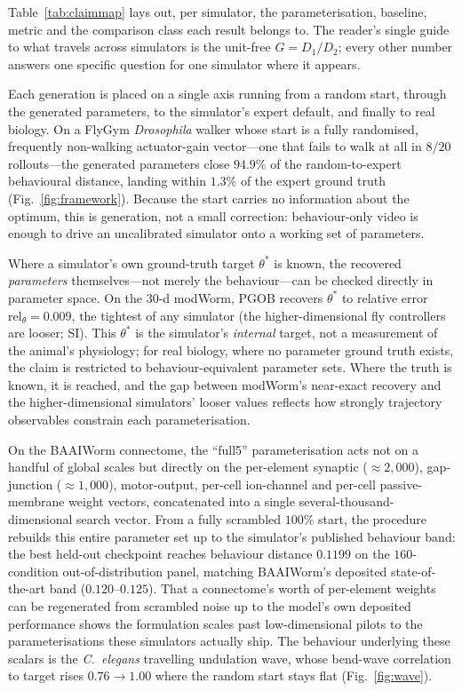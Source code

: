 \documentclass[11pt]{article}
\begin{document}
Table~\ref{tab:claimmap} lays out, per simulator, the parameterisation, baseline, metric and the comparison class each result belongs to. The reader's single guide to what travels across simulators is the unit-free $G{=}D_1/D_2$; every other number answers one specific question for one simulator where it appears.

Each generation is placed on a single axis running from a random start, through the generated parameters, to the simulator's expert default, and finally to real biology. On a FlyGym \emph{Drosophila} walker whose start is a fully randomised, frequently non-walking actuator-gain vector---one that fails to walk at all in $8/20$ rollouts---the generated parameters close $94.9\%$ of the random-to-expert behavioural distance, landing within $1.3\%$ of the expert ground truth (Fig.~\ref{fig:framework}). Because the start carries no information about the optimum, this is generation, not a small correction: behaviour-only video is enough to drive an uncalibrated simulator onto a working set of parameters.

Where a simulator's own ground-truth target $\theta^{*}$ is known, the recovered \emph{parameters} themselves---not merely the behaviour---can be checked directly in parameter space. On the $30$-d modWorm, PGOB recovers $\theta^{*}$ to relative error $\mathrm{rel}_\theta{=}0.009$, the tightest of any simulator (the higher-dimensional fly controllers are looser; SI). This $\theta^{*}$ is the simulator's \emph{internal} target, not a measurement of the animal's physiology; for real biology, where no parameter ground truth exists, the claim is restricted to behaviour-equivalent parameter sets. Where the truth is known, it is reached, and the gap between modWorm's near-exact recovery and the higher-dimensional simulators' looser values reflects how strongly trajectory observables constrain each parameterisation.

On the BAAIWorm connectome, the ``full5'' parameterisation acts not on a handful of global scales but directly on the per-element synaptic ($\approx2{,}000$), gap-junction ($\approx1{,}000$), motor-output, per-cell ion-channel and per-cell passive-membrane weight vectors, concatenated into a single several-thousand-dimensional search vector. From a fully scrambled $100\%$ start, the procedure rebuilds this entire parameter set up to the simulator's published behaviour band: the best held-out checkpoint reaches behaviour distance $0.1199$ on the $160$-condition out-of-distribution panel, matching BAAIWorm's deposited state-of-the-art band ($0.120$--$0.125$). That a connectome's worth of per-element weights can be regenerated from scrambled noise up to the model's own deposited performance shows the formulation scales past low-dimensional pilots to the parameterisations these simulators actually ship. The behaviour underlying these scalars is the \emph{C.~elegans} travelling undulation wave, whose bend-wave correlation to target rises $0.76\to1.00$ where the random start stays flat (Fig.~\ref{fig:wave}).
\end{document}
